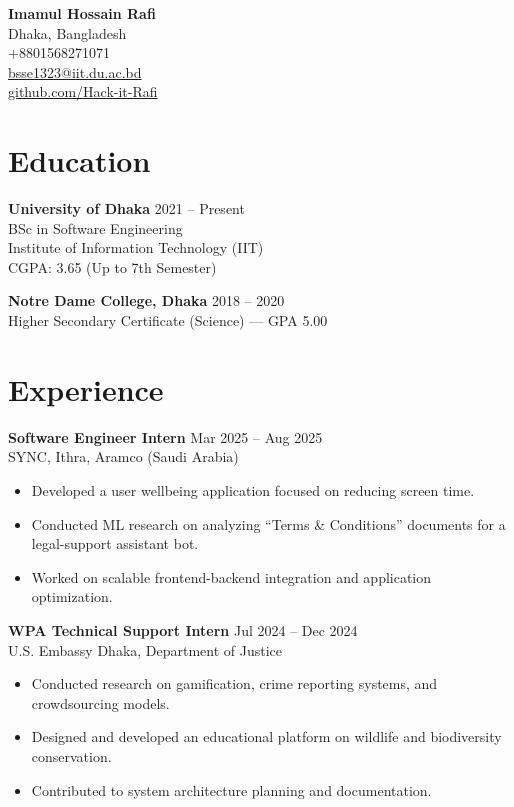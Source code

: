 \documentclass[11pt,a4paper]{article}
\begin{document}

\begin{center}
    {\LARGE \textbf{Imamul Hossain Rafi}} \\
    Dhaka, Bangladesh \\
    +8801568271071 \\
    \href{mailto:bsse1323@iit.du.ac.bd}{bsse1323@iit.du.ac.bd} \\
    \href{https://github.com/Hack-it-Rafi}{github.com/Hack-it-Rafi}
\end{center}



\section*{Education}

\textbf{University of Dhaka} \hfill 2021 -- Present \\
BSc in Software Engineering \\
Institute of Information Technology (IIT) \\
CGPA: 3.65 (Up to 7th Semester)

\textbf{Notre Dame College, Dhaka} \hfill 2018 -- 2020 \\
Higher Secondary Certificate (Science) — GPA 5.00


\section*{Experience}

\textbf{Software Engineer Intern} \hfill Mar 2025 -- Aug 2025 \\
SYNC, Ithra, Aramco (Saudi Arabia)
\begin{itemize}
    \item Developed a user wellbeing application focused on reducing screen time.
    \item Conducted ML research on analyzing “Terms \& Conditions” documents for a legal-support assistant bot.
    \item Worked on scalable frontend-backend integration and application optimization.
\end{itemize}

\textbf{WPA Technical Support Intern} \hfill Jul 2024 -- Dec 2024 \\
U.S. Embassy Dhaka, Department of Justice
\begin{itemize}
    \item Conducted research on gamification, crime reporting systems, and crowdsourcing models.
    \item Designed and developed an educational platform on wildlife and biodiversity conservation.
    \item Contributed to system architecture planning and documentation.
\end{itemize}
\end{document}
